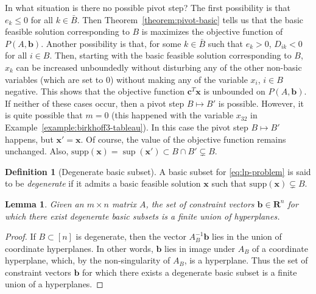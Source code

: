 \documentclass{amsbook}
\newcommand{\xx}{\mathbf x}
\newcommand{\cc}{\mathbf c}
\newcommand{\bb}{\mathbf b}
\newcommand{\supp}{\mathrm{supp}}
\newcommand{\RR}{\mathbf R}
\newtheorem{lemma}[theorem]{Lemma}
\theoremstyle{definition}
\newtheorem{definition}[theorem]{Definition}
\theoremstyle{remark}
\begin{document}
In what situation is there no possible pivot step?
The first possibility is that $e_k\leq 0$ for all $k\in \bar B$.
Then Theorem~\ref{theorem:pivot-basic} tells us that the basic feasible solution corresponding to $B$ is maximizes the objective function of $P(A,\bb)$.
Another possibility is that, for some $k\in\bar B$ such that $e_k>0$, $D_{ik}<0$ for all $i\in B$.
Then, starting with the basic feasible solution corresponding to $B$, $x_k$ can be increased unboundedly without disturbing any of the other non-basic variables (which are set to $0$) without making any of the variable $x_i$, $i\in B$ negative.
This shows that the objective function $\cc^T\xx$ is unbounded on $P(A,\bb)$.
If neither of these cases occur, then a pivot step $B\mapsto B'$ is possible.
However, it is quite possible that $m=0$ (this happened with the variable $x_{32}$ in Example~\ref{example:birkhoff3-tableau}).
In this case the pivot step $B\mapsto B'$ happens, but $\xx'=\xx$.
Of course, the value of the objective function remains unchanged.
Also, $\supp(\xx)=\sup(\xx')\subset B\cap B'\subsetneq B$.
\begin{definition}
  [Degenerate basic subset]
  A basic subset for \eqref{eq:lp-problem} is said to be \emph{degenerate} if it admits a basic feasible solution $\xx$ such that $\supp(\xx)\subsetneq B$.
\end{definition}
\begin{lemma}
  Given an $m\times n$ matrix $A$, the set of constraint vectors $\bb\in \RR^n$ for which there exist degenerate basic subsets is a finite union of hyperplanes.
\end{lemma}
\begin{proof}
  If $B\subset [n]$ is degenerate, then the vector $A_B^{-1}\bb$ lies in the union of coordinate hyperplanes.
  In other words, $\bb$ lies in image under $A_B$ of a coordinate hyperplane, which, by the non-singularity of $A_B$, is a hyperplane.
  Thus the set of constraint vectors $\bb$ for which there exists a degenerate basic subset is a finite union of a hyperplanes.
\end{proof}
\end{document}
